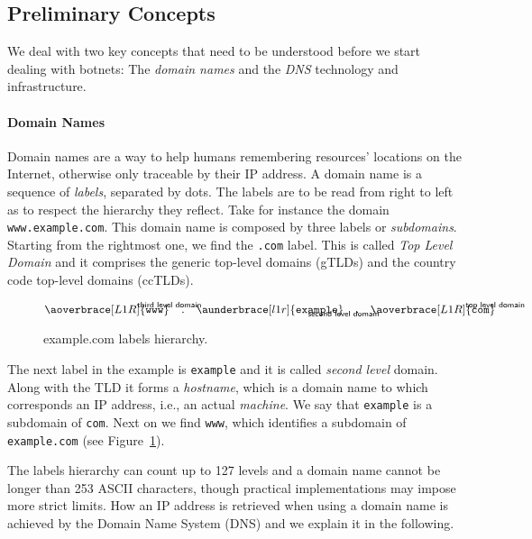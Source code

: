 \subsection{Preliminary Concepts} %
\label{sub:preliminary_concepts}
We deal with two key concepts that need to be understood
before we start dealing with botnets: The \emph{domain names} and the \emph{DNS}
technology and infrastructure.

\paragraph{Domain Names}
Domain names are a way to help humans remembering resources' locations on the Internet,
otherwise only traceable by their IP address. A domain name is a sequence of
\emph{labels}, separated by dots. The labels are to be read from right to left
as to respect the hierarchy they reflect. Take for instance the domain
\texttt{www.example.com}. This domain name is composed by three labels or
\emph{subdomains}. Starting from the rightmost one, we find the \texttt{.com}
label. This is called \emph{Top Level Domain} and it comprises the
generic top-level domains (gTLDs) and the country code top-level domains (ccTLDs).

\begin{figure}[!htp]
\[ \aoverbrace[L1R]{\text{\ttfamily www}}^{\mathclap{\text{\sffamily third level domain}}}%
    \quad.\quad%
    \aunderbrace[l1r]{\text{\ttfamily example}}_{\mathclap{\text{\sffamily second level domain}}}%
    \quad.\quad%
    \aoverbrace[L1R]{\text{\ttfamily com}}^{\mathclap{\text{\sffamily top level domain}}} \]
\caption{example.com labels hierarchy.}
\label{fig:example_com}
\end{figure}

The next label in the example is \texttt{example} and it is called \emph{second level}
domain. Along with the TLD it forms a \emph{hostname}, which is a domain name to which
corresponds an IP address, i.e., an actual \emph{machine}. We say that \texttt{example} is a subdomain of \texttt{com}.
Next on we find \texttt{www}, which identifies a subdomain of \texttt{example.com}
(see Figure~\ref{fig:example_com}).

The labels hierarchy can count up to 127 levels and a domain name cannot be longer
than 253 ASCII characters, though practical implementations may impose more strict
limits. How an IP address is retrieved when using a domain name is achieved by the
Domain Name System (DNS) and we explain it in the following.

